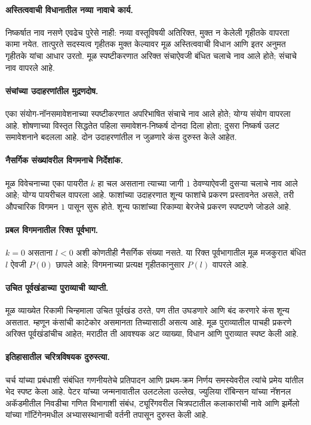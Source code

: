 \paragraph{अस्तित्ववाची विधानातील नव्या नावाचे कार्य.} निष्कर्षात नाव नसणे एवढेच पुरेसे नाही: नव्या वस्तूविषयी अतिरिक्त, मुक्त न केलेली गृहीतके वापरता कामा नयेत. तात्पुरते सदस्यत्व गृहीतक मुक्त केल्यावर मूळ अस्तित्ववाची विधान आणि इतर अनुमत गृहीतके यांचा आधार उरतो. मूळ स्पष्टीकरणात अरिक्त संचाऐवजी बंधित चलाचे नाव आले होते; संचाचे नाव वापरले आहे.
\paragraph{संचांच्या उदाहरणांतील मुद्रणदोष.} एका संयोग-नॉनसमावेशनाच्या स्पष्टीकरणात अपरिभाषित संचाचे नाव आले होते; योग्य संयोग वापरला आहे. शोषणाच्या विस्तृत सिद्धतेत पहिला समावेशन-निष्कर्ष दोनदा दिला होता; दुसरा निष्कर्ष उलट समावेशनाने बदलला आहे. दोन उदाहरणांतील न जुळणारे कंस दुरुस्त केले आहेत.


\paragraph{नैसर्गिक संख्यांवरील विगमनाचे निर्देशांक.} मूळ विवेचनाच्या एका पायरीत $k$ हा चल असताना त्याच्या जागी $1$ ठेवण्याऐवजी दुसऱ्या चलाचे नाव आले आहे; योग्य पायरीचल वापरला आहे. फाशांच्या उदाहरणात शून्य फाशांचे प्रकरण प्रस्तावनेत असले, तरी औपचारिक विगमन $1$ पासून सुरू होते. शून्य फाशांच्या रिकाम्या बेरजेचे प्रकरण स्पष्टपणे जोडले आहे.
\paragraph{प्रबल विगमनातील रिक्त पूर्वभाग.} $k=0$ असताना $l<0$ अशी कोणतीही नैसर्गिक संख्या नसते. या रिक्त पूर्वभागातील मूळ मजकुरात बंधित $l$ ऐवजी $P(0)$ छापले आहे; विगमनाच्या प्रत्यक्ष गृहीतकानुसार $P(l)$ वापरले आहे.
\paragraph{उचित पूर्वखंडाच्या पुराव्याची व्याप्ती.} मूळ व्याख्येत रिकामी चिन्हमाला उचित पूर्वखंड ठरते, पण तीत उघडणारे आणि बंद करणारे कंस शून्य असतात. म्हणून कंसांची काटेकोर असमानता तिच्यासाठी असत्य आहे. मूळ पुराव्यातील पाचही प्रकरणे अरिक्त पूर्वखंडांचीच आहेत; मराठीत ती आवश्यक अट व्याख्या, विधान आणि पुराव्यात स्पष्ट केली आहे.


\paragraph{इतिहासातील चरित्रविषयक दुरुस्त्या.} चर्च यांच्या प्रबंधाशी संबंधित गणनीयतेचे प्रतिपादन आणि प्रथम-क्रम निर्णय समस्येवरील त्यांचे प्रमेय यांतील भेद स्पष्ट केला आहे. पेटर यांच्या जन्मनावातील उलटलेला उल्लेख, ज्युलिया रॉबिन्सन यांच्या नॅशनल अकॅडमीतील निवडीचा गणित विभागाशी संबंध, ट्यूरिंगवरील चित्रपटातील कलाकारांची नावे आणि झर्मेलो यांच्या गॉटिंगेनमधील अभ्यासस्थानाची वर्तनी तपासून दुरुस्त केली आहे.


